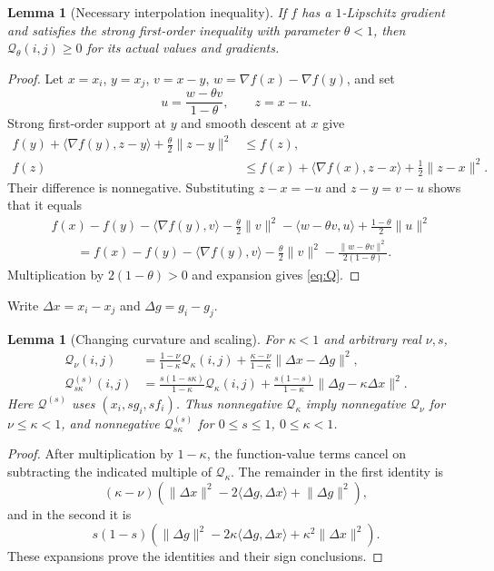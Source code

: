 \documentclass[11pt]{article}
\numberwithin{equation}{section}
\newtheorem{lemma}[theorem]{Lemma}
\theoremstyle{remark}
\newcommand{\ip}[2]{\langle #1,#2\rangle}
\newcommand{\norm}[1]{\lVert #1\rVert}
\newcommand{\grad}{\nabla}
\newcommand{\Q}{\mathcal Q}
\begin{document}
\begin{lemma}[Necessary interpolation inequality]
\label{lem:interpolation}
If $f$ has a $1$-Lipschitz gradient and satisfies the strong first-order
inequality with parameter $\theta<1$, then
$\Q_\theta(i,j)\geq0$ for its actual values and gradients.
\end{lemma}
\begin{proof}
Let $x=x_i$, $y=x_j$, $v=x-y$, $w=\grad f(x)-\grad f(y)$, and set
\[
u=\frac{w-\theta v}{1-\theta},\qquad z=x-u.
\]
Strong first-order support at $y$ and smooth descent at $x$ give
\begin{align*}
f(y)+\ip{\grad f(y)}{z-y}+\frac\theta2\norm{z-y}^2
&\leq f(z),\\
f(z)&\leq f(x)+\ip{\grad f(x)}{z-x}+\frac12\norm{z-x}^2.
\end{align*}
Their difference is nonnegative. Substituting $z-x=-u$ and $z-y=v-u$
shows that it equals
\begin{align*}
&f(x)-f(y)-\ip{\grad f(y)}v-\frac\theta2\norm v^2
 -\ip{w-\theta v}{u}+\frac{1-\theta}{2}\norm u^2\\
&\qquad=
f(x)-f(y)-\ip{\grad f(y)}v-\frac\theta2\norm v^2
 -\frac{\norm{w-\theta v}^2}{2(1-\theta)}.
\end{align*}
Multiplication by $2(1-\theta)>0$ and expansion gives \eqref{eq:Q}.
\end{proof}

Write $\Delta x=x_i-x_j$ and $\Delta g=g_i-g_j$.
\begin{lemma}[Changing curvature and scaling]
\label{lem:changes}
For $\kappa<1$ and arbitrary real $\nu,s$,
\begin{align}
\Q_\nu(i,j)
&=\frac{1-\nu}{1-\kappa}\Q_\kappa(i,j)
 +\frac{\kappa-\nu}{1-\kappa}\norm{\Delta x-\Delta g}^2,
\label{eq:curvature-change}\\
\Q^{(s)}_{s\kappa}(i,j)
&=\frac{s(1-s\kappa)}{1-\kappa}\Q_\kappa(i,j)
 +\frac{s(1-s)}{1-\kappa}\norm{\Delta g-\kappa\Delta x}^2.
\label{eq:scale-change}
\end{align}
Here $\Q^{(s)}$ uses $(x_i,sg_i,sf_i)$.
Thus nonnegative $\Q_\kappa$ imply nonnegative $\Q_\nu$ for
$\nu\leq\kappa<1$, and nonnegative $\Q^{(s)}_{s\kappa}$ for
$0\leq s\leq1$, $0\leq\kappa<1$.
\end{lemma}
\begin{proof}
After multiplication by $1-\kappa$, the function-value terms cancel
on subtracting the indicated multiple of $\Q_\kappa$. The remainder
in the first identity is
\[
(\kappa-\nu)(\norm{\Delta x}^2
 -2\ip{\Delta g}{\Delta x}+\norm{\Delta g}^2),
\]
and in the second it is
\[
s(1-s)(\norm{\Delta g}^2
 -2\kappa\ip{\Delta g}{\Delta x}+\kappa^2\norm{\Delta x}^2).
\]
These expansions prove the identities and their sign conclusions.
\end{proof}
\end{document}
